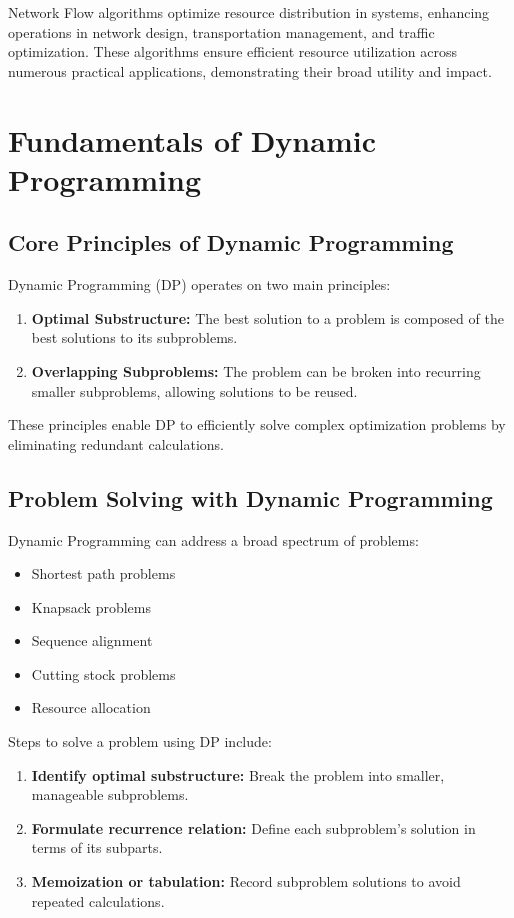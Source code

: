 \documentclass[12pt]{book} %
\begin{document}
Network Flow algorithms optimize resource distribution in systems, enhancing operations in network design, transportation management, and traffic optimization. These algorithms ensure efficient resource utilization across numerous practical applications, demonstrating their broad utility and impact.


\section{Fundamentals of Dynamic Programming}

\subsection{Core Principles of Dynamic Programming}
Dynamic Programming (DP) operates on two main principles:
\begin{enumerate}
    \item \textbf{Optimal Substructure:} The best solution to a problem is composed of the best solutions to its subproblems.
    \item \textbf{Overlapping Subproblems:} The problem can be broken into recurring smaller subproblems, allowing solutions to be reused.
\end{enumerate}

These principles enable DP to efficiently solve complex optimization problems by eliminating redundant calculations.

\subsection{Problem Solving with Dynamic Programming}
Dynamic Programming can address a broad spectrum of problems:
\begin{itemize}
    \item Shortest path problems
    \item Knapsack problems
    \item Sequence alignment
    \item Cutting stock problems
    \item Resource allocation
\end{itemize}

Steps to solve a problem using DP include:
\begin{enumerate}
    \item \textbf{Identify optimal substructure:} Break the problem into smaller, manageable subproblems.
    \item \textbf{Formulate recurrence relation:} Define each subproblem's solution in terms of its subparts.
    \item \textbf{Memoization or tabulation:} Record subproblem solutions to avoid repeated calculations.
\end{enumerate}
\end{document}
